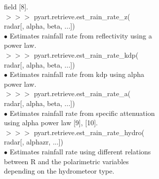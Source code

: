 \documentclass[potrait,a0paper,fontscale=0.33]{baposter} %
\begin{document}
\begin{poster}
{\begin{flushleft}
\-\hspace{0.7cm} field [8].\\
$>$$>$$>$ pyart.retrieve.est\_rain\_rate\_z(\\
\-\hspace{1.5cm} radar[, alpha, beta, ...])\\
\-\hspace{0.4cm} $\bullet$ Estimates rainfall rate from reflectivity using a\\
\-\hspace{0.7cm} power law.\\
$>$$>$$>$ pyart.retrieve.est\_rain\_rate\_kdp(\\
\-\hspace{1.5cm} radar[, alpha, beta, ...])\\
\-\hspace{0.4cm} $\bullet$ Estimates rainfall rate from kdp using alpha\\
\-\hspace{0.7cm} power law.\\
$>$$>$$>$ pyart.retrieve.est\_rain\_rate\_a(\\
\-\hspace{1.5cm} radar[, alpha, beta, ...])\\
\-\hspace{0.4cm} $\bullet$ Estimates rainfall rate from specific attenuation\\
\-\hspace{0.7cm} using alpha power law [9], [10].\\
$>$$>$$>$ pyart.retrieve.est\_rain\_rate\_hydro(\\
\-\hspace{1.5cm} radar[, alphazr, ...])\\
\-\hspace{0.4cm} $\bullet$ Estimates rainfall rate using different relations\\
\-\hspace{0.7cm} between R and the polarimetric variables\\
\-\hspace{0.7cm} depending on the hydrometeor type.\\

\end{flushleft}

}

\end{poster}
\newpage

\end{document}
